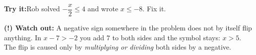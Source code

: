 \documentclass[12pt]{article}
\begin{document}
\begin{tryitbox}
\textbf{Try it:}\quad Rob solved $-\dfrac{x}{2} \le 4$ and wrote $x \le -8$. Fix it.\\[2pt]
\end{tryitbox}

\begin{watchoutbox}
\textbf{(!) Watch out:} A negative sign somewhere in the problem does not by
itself flip anything. In $x - 7 > -2$ you add $7$ to both sides and the symbol
stays: $x > 5$. The flip is caused only by \emph{multiplying or dividing} both
sides by a negative.
\end{watchoutbox}
\end{document}
